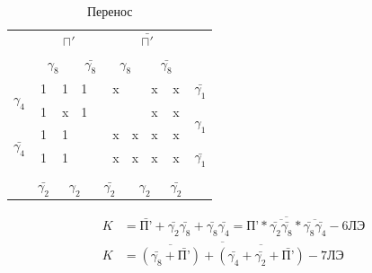 \documentclass[a4paper,14pt]{article}
\begin{document}
\begin{table}[H]
	\begin{center}
		\caption{Перенос}
		\begin{tabular}{cccccccccc}
			& \multicolumn{4}{c}{$\sqcap'$} & \multicolumn{4}{c}{$\bar{\sqcap'}$} &  \\
			& \multicolumn{2}{c}{$\gamma_8$} & \multicolumn{2}{c}{$\bar{\gamma_8}$} & \multicolumn{2}{c}{$\gamma_8$} & \multicolumn{2}{c}{$\bar{\gamma_8}$} &  \\ \cline{2-9}
			\multicolumn{1}{c|}{\multirow{2}{*}{$\gamma_4$}} & \multicolumn{1}{c|}{1} & \multicolumn{1}{c|}{1} & \multicolumn{1}{c|}{1} & \multicolumn{1}{c|}{} & \multicolumn{1}{c|}{x} & \multicolumn{1}{c|}{} & \multicolumn{1}{c|}{x} & \multicolumn{1}{c|}{x} & $\bar{\gamma_1}$ \\ \cline{2-9}
			\multicolumn{1}{c|}{} & \multicolumn{1}{c|}{1} & \multicolumn{1}{c|}{x} & \multicolumn{1}{c|}{1} & \multicolumn{1}{c|}{} & \multicolumn{1}{c|}{} & \multicolumn{1}{c|}{} & \multicolumn{1}{c|}{x} & \multicolumn{1}{c|}{x} & \multirow{2}{*}{$\gamma_1$} \\ \cline{2-9}
			\multicolumn{1}{c|}{\multirow{2}{*}{$\bar{\gamma_4}$}} & \multicolumn{1}{c|}{1} & \multicolumn{1}{c|}{1} & \multicolumn{1}{c|}{} & \multicolumn{1}{c|}{} & \multicolumn{1}{c|}{x} & \multicolumn{1}{c|}{x} & \multicolumn{1}{c|}{x} & \multicolumn{1}{c|}{x} &  \\ \cline{2-9}
			\multicolumn{1}{c|}{} & \multicolumn{1}{c|}{1} & \multicolumn{1}{c|}{1} & \multicolumn{1}{c|}{} & \multicolumn{1}{c|}{} & \multicolumn{1}{c|}{x} & \multicolumn{1}{c|}{x} & \multicolumn{1}{c|}{x} & \multicolumn{1}{c|}{x} & $\bar{\gamma_1}$ \\ \cline{2-9}
			\\
			& $\bar{\gamma_2}$ & \multicolumn{2}{c}{$\gamma_2$} & \multicolumn{2}{c}{$\bar{\gamma_2}$} & \multicolumn{2}{c}{$\gamma_2$} & $\bar{\gamma_2}$ & 
		\end{tabular}
	\end{center}
\end{table}


\begin{equation*}
\begin{aligned}
K &= \bar{\text{П'}} + \bar{\gamma_2}\bar{\gamma_8} + \bar{\gamma_8}\bar{\gamma_4} = \overline{\text{П'}*\overline{\bar{\gamma_2}\bar{\gamma_8}}*\overline{\bar{\gamma_8}\bar{\gamma_4}}}- \text{6ЛЭ} \\
K &= \overline{\overline{(\bar{\gamma_8}+\bar{\text{П'}})} + \overline{(\bar{\gamma_4}+\bar{\gamma_2}+\bar{\text{П'}})}} - \text{7ЛЭ}
\end{aligned}
\end{equation*}
\end{document}
